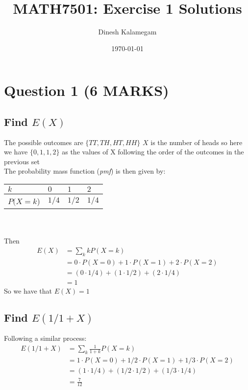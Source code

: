 \documentclass[10pt]{article}
\begin{document}
\title{MATH7501: Exercise 1 Solutions}
\author{Dinesh Kalamegam}
\date{\today}
\maketitle

\newtheorem{theorem}{Theorem}[section]
\newtheorem{definition}[theorem]{Defintion}
\newtheorem{proposition}[theorem]{Proposition}
\newtheorem{corollary}[theorem]{Corollary}

\section{Question 1 (6 MARKS)}
\subsection{Find $E(X)$}
The possible outcomes are $\{TT,TH,HT,HH\}$ $X$ is the number of heads so here we have $\{0,1,1,2\}$ as the values of X following the order of the outcomes in the previous set
\\
The probability mass function (\emph{pmf}) is then given by:
\\

\begin{tabularx}{\textwidth}{ |X|X|X|X| }
  \hline
  $k$ & $0$ & $1$ & $2$ \\
  \hline
  $P(X=k$) & $1/4$  & $1/2$  & $1/4$  \\
  \hline
\end{tabularx}
\\
\\
Then
\begin{align*}
    E(X) &= \sum_{k} kP(X=k) \\
         &= 0 \cdot P(X=0) + 1 \cdot P(X=1) + 2 \cdot P(X=2) \\
         &= (0 \cdot 1/4) + (1 \cdot 1/2) + (2 \cdot 1/4) \\
         &= 1
\end{align*}
So we have that $E(X)=1$

\subsection{Find $E(1/1+X)$}
Following a similar process:
\begin{align*}
    E(1/1+X) &= \sum_{k} \frac{1}{1+k} P(X=k) \\
         &= 1 \cdot P(X=0) + 1/2 \cdot P(X=1) + 1/3 \cdot P(X=2) \\
         &= (1 \cdot 1/4) + (1/2 \cdot 1/2) + (1/3 \cdot 1/4) \\
         &= \frac{7}{12}
\end{align*}
\end{document}
